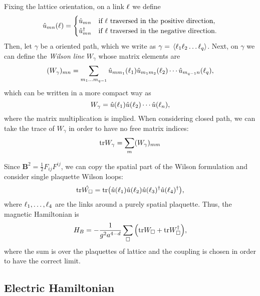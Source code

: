 Fixing the lattice orientation, on a link $\ell$ we define
\begin{equation}
    \hat{u}_{mn}(\ell) =
    \begin{cases}
        \hat{u}_{mn} & \text{if $\ell$ traversed in the positive direction}, \\
        \hat{u}_{mn}^{\dagger} & \text{if $\ell$ traversed in the negative direction}.
    \end{cases}
\end{equation}
Then, let $\gamma$ be a oriented path, which we write as $\gamma = \ev*{\link_1 \link_2 \dots \link_q}$.
Next, on $\gamma$ we can define the \emph{Wilson line} $W_{\gamma}$ whose matrix elements are
\begin{equation}
    (W_{\gamma})_{mn} =
    \sum_{m_1 \dots m_{q-1}}
        \hat{u}_{m m_1} (\ell_1)
        \hat{u}_{m_1 m_2} (\ell_2)
        \cdots
        \hat{u}_{m_{q-1} n} (\ell_q),
\end{equation}
which can be written in a more compact way as
\begin{equation}
    W_{\gamma} =
        \hat{u}(\ell_1)
        \hat{u}(\ell_2)
        \cdots
        \hat{u}(\ell_n),
\end{equation}
where the matrix multiplication is implied.
When considering closed path, we can take the trace of $W_{\gamma}$ in order to have no free matrix indices:
\begin{equation}
    \text{tr} W_{\gamma} = \sum_{m} (W_{\gamma})_{mm}
\end{equation}

Since $\bm{B}^2 = \frac{1}{2} F_{ij} F^{ij}$, we can copy the spatial part of the Wilson formulation and consider single plaquette Wilson loops:
\begin{equation}
    \text{tr} \hat{W_{\square}} = \text{tr} \qty(
        \hat{u}(\ell_1) \hat{u}(\ell_2) \hat{u}(\ell_3)^{\dagger}  \hat{u}(\ell_4)^{\dagger}
    ),
\end{equation}
where $\ell_1, \dots, \ell_4$ are the links around a purely spatial plaquette.
Thus, the magnetic Hamiltonian is
\begin{equation}
    H_B = - \frac{1}{g^2 a^{4-d}} \sum_{\square} \qty( \text{tr} W_{\square} + \text{tr} W_{\square}^{\dagger} ),
\end{equation}
where the sum is over the plaquettes of lattice and the coupling is chosen in order to have the correct limit.


\subsection{Electric Hamiltonian}
\label{sub:electric_hamiltonian}

